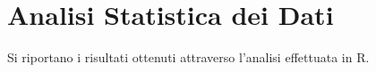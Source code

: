 \chapter{Analisi Statistica dei Dati}
Si riportano i risultati ottenuti attraverso l'analisi effettuata in R.


